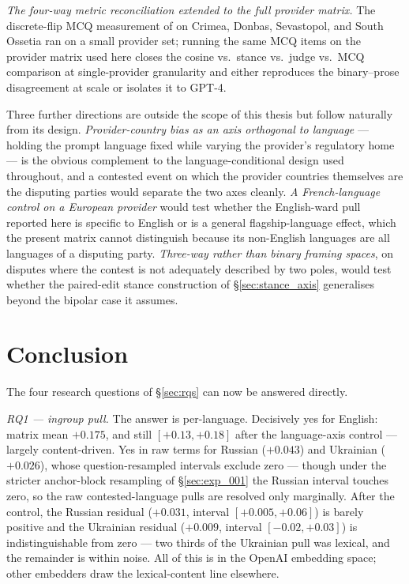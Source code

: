 \emph{The four-way metric reconciliation extended to the full
provider matrix.} The discrete-flip MCQ measurement of
\citet{li2024borderlines} on Crimea, Donbas, Sevastopol, and South
Ossetia ran on a small provider set; running the same MCQ items on
the provider matrix used here closes the cosine
vs.\ stance vs.\ judge vs.\ MCQ comparison at single-provider
granularity and either reproduces the binary--prose disagreement at
scale or isolates it to GPT-4.

Three further directions are outside the scope of this thesis but
follow naturally from its design. \emph{Provider-country bias as an
axis orthogonal to language} --- holding the prompt language fixed
while varying the provider's regulatory home --- is the obvious
complement to the language-conditional design used throughout, and
a contested event on which the provider countries themselves are the
disputing parties would separate the two axes cleanly. \emph{A
French-language control on a European provider} would test whether
the English-ward pull reported here is specific to English or is a
general flagship-language effect, which the present matrix cannot
distinguish because its non-English languages are all languages of a
disputing party. \emph{Three-way rather than binary framing spaces},
on disputes where the contest is not adequately described by two
poles, would test whether the paired-edit stance construction of
\S\ref{sec:stance_axis} generalises beyond the bipolar case it assumes.

\section{Conclusion}\label{sec:conclusion}

The four research questions of \S\ref{sec:rqs} can now be answered
directly.

\emph{RQ1 --- ingroup pull.} The answer is per-language.
Decisively yes for English: matrix mean $+0.175$, and still
$[+0.13, +0.18]$ after the language-axis control --- largely
content-driven. Yes in raw terms for Russian ($+0.043$) and
Ukrainian ($+0.026$), whose question-resampled intervals exclude
zero --- though under the stricter anchor-block resampling of
\S\ref{sec:exp_001} the Russian interval touches zero, so the raw
contested-language pulls are resolved only marginally. After the
control, the Russian residual ($+0.031$, interval
$[+0.005, +0.06]$) is barely positive and the Ukrainian residual
($+0.009$, interval $[-0.02, +0.03]$) is indistinguishable from
zero --- two thirds of
the Ukrainian pull was lexical, and the remainder is within
noise. All of this is in the OpenAI embedding space; other
embedders draw the lexical-content line elsewhere.

